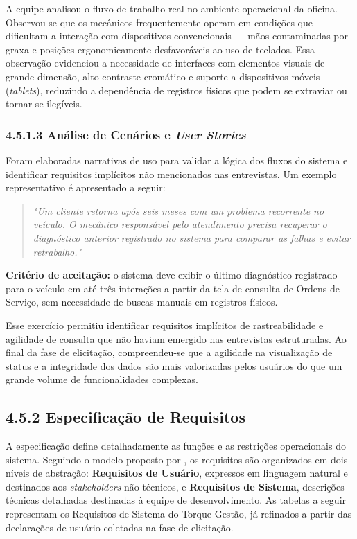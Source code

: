 \documentclass[12pt, a4paper]{article}
\begin{document}
A equipe analisou o fluxo de trabalho real no ambiente operacional da oficina.
Observou-se que os mecânicos frequentemente operam em condições que dificultam
a interação com dispositivos convencionais — mãos contaminadas por graxa e
posições ergonomicamente desfavoráveis ao uso de teclados. Essa observação
evidenciou a necessidade de interfaces com elementos visuais de grande dimensão,
alto contraste cromático e suporte a dispositivos móveis (\textit{tablets}),
reduzindo a dependência de registros físicos que podem se extraviar ou
tornar-se ilegíveis.

\subsubsection{4.5.1.3 Análise de Cenários e \textit{User Stories}}

Foram elaboradas narrativas de uso para validar a lógica dos fluxos do sistema
e identificar requisitos implícitos não mencionados nas entrevistas. Um exemplo
representativo é apresentado a seguir:

\begin{quote}
\textit{"Um cliente retorna após seis meses com um problema recorrente no
veículo. O mecânico responsável pelo atendimento precisa recuperar o diagnóstico
anterior registrado no sistema para comparar as falhas e evitar retrabalho."}
\end{quote}

\noindent\textbf{Critério de aceitação:} o sistema deve exibir o último
diagnóstico registrado para o veículo em até três interações a partir da tela
de consulta de Ordens de Serviço, sem necessidade de buscas manuais em
registros físicos.

Esse exercício permitiu identificar requisitos implícitos de rastreabilidade e
agilidade de consulta que não haviam emergido nas entrevistas estruturadas.
Ao final da fase de elicitação, compreendeu-se que a agilidade na visualização
de status e a integridade dos dados são mais valorizadas pelos usuários do que
um grande volume de funcionalidades complexas.

\subsection{4.5.2 Especificação de Requisitos}
\label{subsec:especificacao}

A especificação define detalhadamente as funções e as restrições operacionais
do sistema. Seguindo o modelo proposto por , os
requisitos são organizados em dois níveis de abstração: \textbf{Requisitos de
Usuário}, expressos em linguagem natural e destinados aos
\textit{stakeholders} não técnicos, e \textbf{Requisitos de Sistema},
descrições técnicas detalhadas destinadas à equipe de desenvolvimento. As
tabelas a seguir representam os Requisitos de Sistema do Torque Gestão, já
refinados a partir das declarações de usuário coletadas na fase de elicitação.
\end{document}
